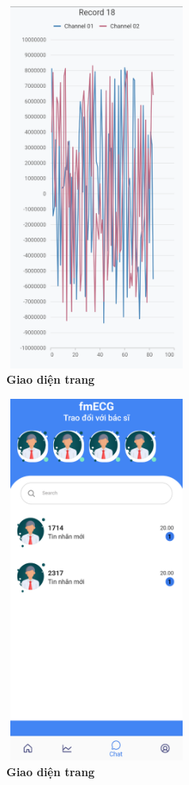 \begin{figure}[H]
  \centering
  \includegraphics[width=6cm,height=12cm]{Images/mobile_app/demo/detail_record.png}
  \caption[Giao diện trang]{\bfseries \fontsize{12pt}{0pt}\selectfont Giao diện trang}
  \label{demo_} %
\end{figure}

\begin{figure}[H]
  \centering
  \includegraphics[width=6cm,height=12cm]{Images/mobile_app/demo/chat_preview.png}
  \caption[Giao diện trang]{\bfseries \fontsize{12pt}{0pt}\selectfont Giao diện trang}
  \label{demo_} %
\end{figure}

